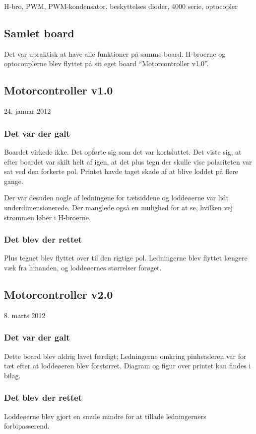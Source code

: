 \documentclass[a4paper,oneside,article,danish,table]{memoir}
\newcommand{\boarddate}[1]{\textcolor{blue!80!black}{#1}}
\begin{document}
H-bro, PWM, PWM-kondensator, beskyttelses dioder, 4000 serie, optocopler

\subsection{Samlet board}
Det var upraktisk at have alle funktioner på samme board. H-broerne og optocouplerne blev flyttet på sit eget board “Motorcontroller v1.0”.

\subsection{Motorcontroller v1.0} 
\boarddate{24. januar 2012}
\subsubsection{Det var der galt}
Boardet virkede ikke. Det opførte sig som det var kortsluttet. Det viste sig, at efter boardet var skilt helt af igen, at det plus tegn der skulle vise polariteten var sat ved den forkerte pol. Printet havde taget skade af at blive loddet på flere gange.

Der var desuden nogle af ledningene for tætsiddene og loddeøerne var lidt underdimensionerede. Der manglede også en mulighed for at se, hvilken vej strømmen løber i H-broerne.
\subsubsection{Det blev der rettet}
Plus tegnet blev flyttet over til den rigtige pol. Ledningerne blev flyttet længere væk fra hinanden, og loddeøernes størrelser forøget.

\subsection{Motorcontroller v2.0}
\boarddate{8. marts 2012} 
\subsubsection{Det var der galt}
Dette board blev aldrig lavet færdigt; Ledningerne omkring pinheaderen var for tæt efter at loddeøeren blev forstørret. Diagram og figur over printet kan findes i bilag. 

\subsubsection{Det blev der rettet}
Loddeøerne blev gjort en smule mindre for at tillade ledningerners forbipasserend.
\end{document}
